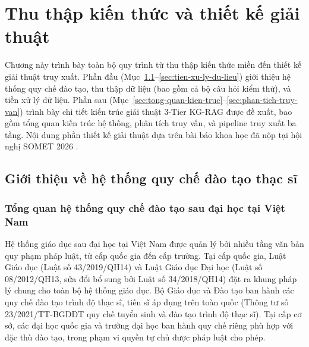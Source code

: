 \chapter{Thu thập kiến thức và thiết kế giải thuật}
\label{chap:thiet-ke-giai-thuat}

Chương này trình bày toàn bộ quy trình từ thu thập kiến thức miền đến thiết kế
giải thuật truy xuất. Phần đầu
(Mục~\ref{sec:gioithieu_quyche}--\ref{sec:tien-xu-ly-du-lieu}) giới thiệu hệ thống
quy chế đào tạo, thu thập dữ liệu (bao gồm cả bộ câu hỏi kiểm thử), và tiền xử
lý dữ liệu. Phần sau
(Mục~\ref{sec:tong-quan-kien-truc}--\ref{sec:phan-tich-truy-van}) trình bày chi
tiết kiến trúc giải thuật 3-Tier KG-RAG được đề xuất, bao gồm tổng quan kiến trúc
hệ thống, phân tích truy vấn, và pipeline truy xuất ba tầng.
Nội dung phần thiết kế giải thuật dựa trên bài báo khoa học đã nộp tại hội nghị
SOMET 2026 \cite{le2026threetier}.


\section{Giới thiệu về hệ thống quy chế đào tạo thạc sĩ}
\label{sec:gioithieu_quyche}

\subsection{Tổng quan hệ thống quy chế đào tạo sau đại học tại Việt Nam}
\label{subsec:tongquan_hethong}

Hệ thống giáo dục sau đại học tại Việt Nam được quản lý bởi nhiều tầng văn bản quy
phạm pháp luật, từ cấp quốc gia đến cấp trường. Tại cấp quốc gia, Luật Giáo dục
(Luật số 43/2019/QH14) và Luật Giáo dục Đại học (Luật số 08/2012/QH13, sửa đổi bổ
sung bởi Luật số 34/2018/QH14) đặt ra khung pháp lý chung cho toàn bộ hệ thống giáo
dục. Bộ Giáo dục và Đào tạo ban hành các quy chế đào tạo trình độ thạc sĩ, tiến sĩ
áp dụng trên toàn quốc (Thông tư số 23/2021/TT-BGDĐT quy chế tuyển sinh và đào tạo
trình độ thạc sĩ). Tại cấp cơ sở, các đại học quốc gia và trường đại học ban hành
quy chế riêng phù hợp với đặc thù đào tạo, trong phạm vi quyền tự chủ được pháp
luật cho phép.

